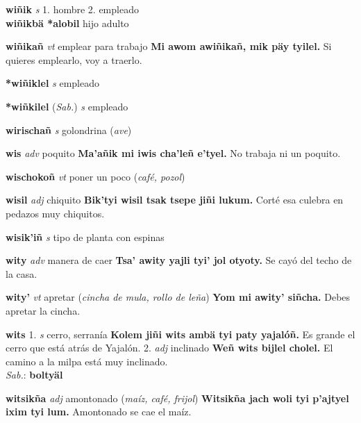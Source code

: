\documentclass[10pt]{scrbook}
\newcommand{\entry}[1]{\textbf{#1}}
\newcommand{\onedefinition}[1]{#1.}
\newcommand{\partofspeech}[1]{\textit{#1}}
\newcommand{\spanishtranslation}[1]{#1}
\newcommand{\clarification}[1]{(\textit{#1})}
\newcommand{\cholexample}[1]{\textbf{#1}}
\newcommand{\exampletranslation}[1]{#1}
\newcommand{\dialectvariant}[1]{\\\textit{#1}:}
\newcommand{\dialectword}[1]{\textbf{#1}}
\newcommand{\relevantdialect}[1]{(\textit{#1})}
\newcommand{\secondaryentry}[1]{\\\textbf{#1}}
\newcommand{\secondtranslation}[1]{#1}
\begin{document}
\begin{multicols}{2}
\entry{wiñik}
\partofspeech{s}
\onedefinition{1}
\spanishtranslation{hombre}
\onedefinition{2}
\spanishtranslation{empleado}
\secondaryentry{wiñikbä *alobil}
\secondtranslation{hijo adulto}

\entry{wiñikañ}
\partofspeech{vt}
\spanishtranslation{emplear para trabajo}
\cholexample{Mi awom awiñikañ, mik päy tyilel.}
\exampletranslation{Si quieres emplearlo, voy a traerlo.}

\entry{*wiñiklel}
\partofspeech{s}
\spanishtranslation{empleado}

\entry{*wiñkilel}
\relevantdialect{Sab.}
\partofspeech{s}
\spanishtranslation{empleado}

\entry{wirischañ}
\partofspeech{s}
\spanishtranslation{golondrina}
\clarification{ave}

\entry{wis}
\partofspeech{adv}
\spanishtranslation{poquito}
\cholexample{Ma'añik mi iwis cha'leñ e'tyel.}
\exampletranslation{No trabaja ni un poquito.}

\entry{wischokoñ}
\partofspeech{vt}
\spanishtranslation{poner un poco}
\clarification{café, pozol}

\entry{wisil}
\partofspeech{adj}
\spanishtranslation{chiquito}
\cholexample{Bik'tyi wisil tsak tsepe jiñi lukum.}
\exampletranslation{Corté esa culebra en pedazos muy chiquitos.}

\entry{wisik'iñ}
\partofspeech{s}
\spanishtranslation{tipo de planta con espinas}

\entry{wity}
\partofspeech{adv}
\spanishtranslation{manera de caer}
\cholexample{Tsa' awity yajli tyi' jol otyoty.}
\exampletranslation{Se cayó del techo de la casa.}

\entry{wity'}
\partofspeech{vt}
\spanishtranslation{apretar}
\clarification{cincha de mula, rollo de leña}
\cholexample{Yom mi awity' siñcha.}
\exampletranslation{Debes apretar la cincha.}

\entry{wits}
\onedefinition{1}
\partofspeech{s}
\spanishtranslation{cerro, serranía}
\cholexample{Kolem jiñi wits ambä tyi paty yajalóñ.}
\exampletranslation{Es grande el cerro que está atrás de Yajalón.}
\onedefinition{2}
\partofspeech{adj}
\spanishtranslation{inclinado}
\cholexample{Weñ wits bijlel cholel.}
\exampletranslation{El camino a la milpa está muy inclinado.}
\dialectvariant{Sab.}
\dialectword{boltyäl}

\entry{witsikña}
\partofspeech{adj}
\spanishtranslation{amontonado}
\clarification{maíz, café, frijol}
\cholexample{Witsikña jach woli tyi p'ajtyel ixim tyi lum.}
\exampletranslation{Amontonado se cae el maíz.}


\end{multicols}
\end{document}
